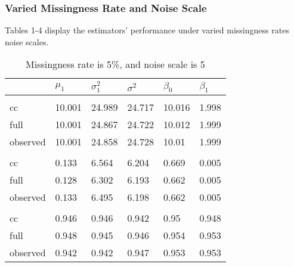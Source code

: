 \documentclass[
  twocolumn]{article}
\begin{document}
\hypertarget{varied-missingness-rate-and-noise-scale}{%
\subsubsection{Varied Missingness Rate and Noise
Scale}\label{varied-missingness-rate-and-noise-scale}}

Tables 1-4 display the estimators' performance under varied missingness
rates noise scales.

\begin{table}[h]
\caption{Missingness rate is 5\%, and noise scale is 5}
\begingroup\fontsize{7}{9}\selectfont

\begin{tabu} to 
\toprule
 & $\mu_1$ & $\sigma^2_1$ & $\sigma^2$ & $\beta_0$ & $\beta_1$\\
\midrule
\addlinespace[0.3em]
\\
\hspace{1em}cc & 10.001 & 24.989 & 24.717 & 10.016 & 1.998\\
\hspace{1em}full & 10.001 & 24.867 & 24.722 & 10.012 & 1.999\\
\hspace{1em}observed & 10.001 & 24.858 & 24.728 & 10.01 & 1.999\\
\addlinespace[0.3em]
\\
\hspace{1em}cc & 0.133 & 6.564 & 6.204 & 0.669 & 0.005\\
\hspace{1em}full & 0.128 & 6.302 & 6.193 & 0.662 & 0.005\\
\hspace{1em}observed & 0.133 & 6.495 & 6.198 & 0.662 & 0.005\\
\addlinespace[0.3em]
\\
\hspace{1em}cc & 0.946 & 0.946 & 0.942 & 0.95 & 0.948\\
\hspace{1em}full & 0.948 & 0.945 & 0.946 & 0.954 & 0.953\\
\hspace{1em}observed & 0.942 & 0.942 & 0.947 & 0.953 & 0.953\\
\bottomrule
\end{tabu}
\endgroup{}
\end{table}
\end{document}

